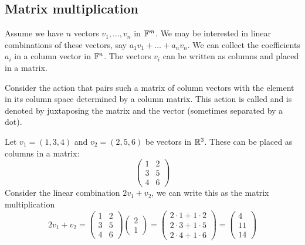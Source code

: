 \subsection{Matrix multiplication}
Assume we have $n$ vectors $v_1,\ldots, v_n$ in $\mathbb{F}^m$. We may be interested in linear combinations of these vectors, say $a_1v_1+\ldots + a_nv_n$. We can collect the coefficients $a_i$ in a column vector in $\mathbb{F}^n$. The vectors $v_i$ can be written as columns and placed in a matrix.

Consider the action that pairs such a matrix of column vectors with the element in its column space determined by a column matrix. This action is called  and is denoted by juxtaposing the matrix and the vector (sometimes separated by a dot).

\begin{example}
Let $v_1 = (1,3,4)$ and $v_2 = (2,5,6)$ be vectors in $\mathbb{R}^3$. These can be placed as columns in a matrix:
\[ \begin{pmatrix}
1 & 2 \\ 3 & 5 \\ 4 & 6
\end{pmatrix} \]
Consider the linear combination $2v_1 + v_2$, we can write this as the matrix multiplication
\[ 2v_1 + v_2 = \begin{pmatrix}
1 & 2 \\ 3 & 5 \\ 4 & 6
\end{pmatrix}\begin{pmatrix}
2 \\ 1
\end{pmatrix} = \begin{pmatrix}
2\cdot 1 + 1\cdot 2 \\
2\cdot 3 + 1\cdot 5 \\
2\cdot 4 + 1\cdot 6
\end{pmatrix} = \begin{pmatrix}
4 \\ 11 \\ 14
\end{pmatrix} \]
\end{example}

